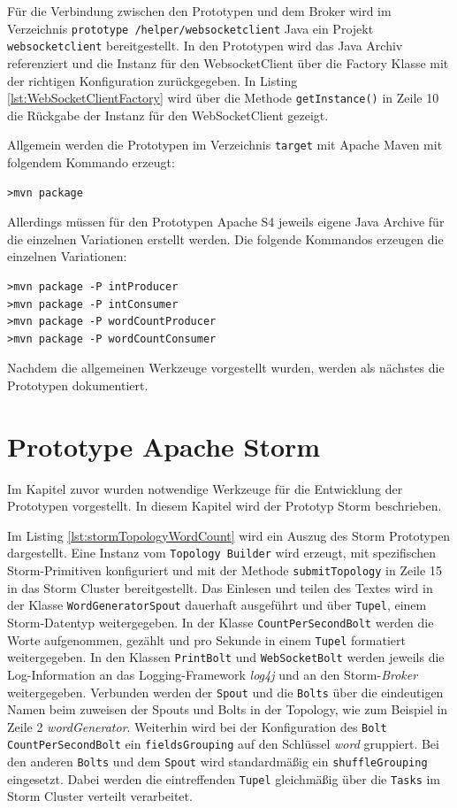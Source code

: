 Für die Verbindung zwischen den Prototypen und dem Broker wird im Verzeichnis \texttt{prototype /helper/websocketclient} Java ein Projekt \texttt{websocketclient} bereitgestellt. In den Prototypen wird das Java Archiv referenziert und 
die Instanz für den WebsocketClient über die Factory Klasse mit der richtigen Konfiguration zurückgegeben. In Listing \ref{lst:WebSocketClientFactory} wird über die Methode \texttt{getInstance()} in Zeile 10 die Rückgabe der Instanz für den WebSocketClient gezeigt.

Allgemein werden die Prototypen im Verzeichnis \texttt{target} mit Apache Maven mit folgendem Kommando erzeugt:
\begin{verbatim}
>mvn package
\end{verbatim}

Allerdings müssen für den Prototypen Apache S4 jeweils eigene Java Archive für die einzelnen Variationen erstellt werden. Die folgende Kommandos erzeugen die einzelnen Variationen:
\begin{verbatim}
>mvn package -P intProducer
>mvn package -P intConsumer
>mvn package -P wordCountProducer
>mvn package -P wordCountConsumer
\end{verbatim}

Nachdem die allgemeinen Werkzeuge vorgestellt wurden, werden als nächstes die Prototypen dokumentiert.


\section{Prototype Apache Storm}
\label{sec:prot:storm}

Im Kapitel zuvor wurden notwendige Werkzeuge für die Entwicklung der Prototypen vorgestellt. In diesem Kapitel wird der Prototyp Storm beschrieben. 

Im Listing \ref{lst:stormTopologyWordCount} wird ein Auszug des Storm Prototypen dargestellt. Eine Instanz vom \texttt{Topology Builder} wird erzeugt, mit spezifischen Storm-Primitiven konfiguriert und mit der Methode \texttt{submitTopology} in Zeile 15 in das Storm Cluster bereitgestellt. Das Einlesen und teilen des Textes wird in der Klasse \texttt{WordGeneratorSpout} dauerhaft ausgeführt und über \texttt{Tupel}, einem Storm-Datentyp weitergegeben. In der Klasse \texttt{CountPerSecondBolt} werden die Worte aufgenommen, gezählt und pro Sekunde in einem \texttt{Tupel} formatiert weitergegeben. In den Klassen \texttt{PrintBolt} und \texttt{WebSocketBolt} werden jeweils die Log-Information an das Logging-Framework \textit{log4j} und an den Storm-\textit{Broker} weitergegeben. Verbunden werden der \texttt{Spout} und die \texttt{Bolts} über die eindeutigen Namen beim zuweisen der Spouts und Bolts in der Topology, wie zum Beispiel in Zeile 2 \textit{wordGenerator}. Weiterhin wird bei der Konfiguration des \texttt{Bolt} \texttt{CountPerSecondBolt} ein \texttt{fieldsGrouping} auf den Schlüssel \textit{word} gruppiert. Bei den anderen \texttt{Bolts} und dem \texttt{Spout} wird standardmäßig ein \texttt{shuffleGrouping} eingesetzt. Dabei werden die eintreffenden \texttt{Tupel} gleichmäßig über die \texttt{Tasks} im Storm Cluster verteilt verarbeitet.

